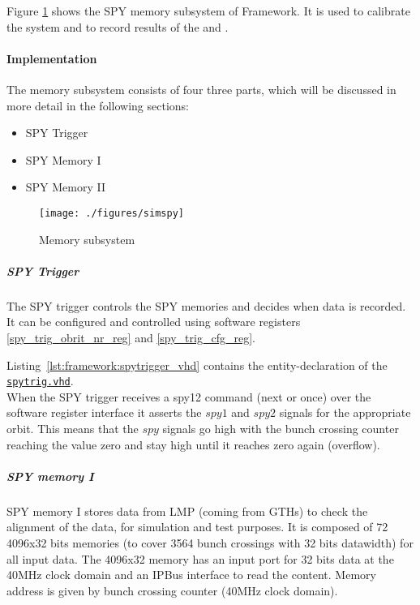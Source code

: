 Figure \ref{fig_simspy} shows the SPY memory subsystem of Framework.
It is used to calibrate the system and to record results of the \ugtl and \ufdl.

\paragraph{Implementation}\label{sec:framework:spy_impl}
The memory subsystem consists of four three parts, which will be discussed in more detail in the following sections:

\begin{itemize}
\item SPY Trigger
\item SPY Memory I
\item SPY Memory II
\end{itemize}

\begin{figure}[h]
\texttt{[image: ./figures/simspy]}
\caption{Memory subsystem}
\label{fig_simspy}
\end{figure}

\subparagraph{SPY Trigger}\label{sec:framework:spy_trigger}
The SPY trigger controls the SPY memories and decides when data is recorded. It can be configured and controlled using software registers \ref{spy_trig_obrit_nr_reg} and \ref{spy_trig_cfg_reg}.

Listing~\ref{lst:framework:spytrigger_vhd} contains the entity-declaration of the \href{\gitbranch/firmware/hdl/payload/frame/spytrig.vhd}{\texttt{\textquotesingle spytrig.vhd\textquotesingle }}.\\



When the SPY trigger receives a spy12 command (next or once) over the software register interface it asserts the $spy1$ and $spy2$ signals for the appropriate orbit.
This means that the $spy$ signals go high with the bunch crossing counter reaching the value zero and stay high until it reaches zero again (overflow).

\subparagraph{SPY memory I}
SPY memory I stores data from LMP (coming from GTHs) to check the alignment of the data, for simulation and test purposes. It is composed of 72 4096x32 bits memories (to cover 3564 bunch crossings with 32 bits datawidth) for all input data. The 4096x32 memory has an input port for 32 bits data at the 40MHz clock domain and an IPBus interface to read the content. Memory address is given by bunch crossing counter (40MHz clock domain).

